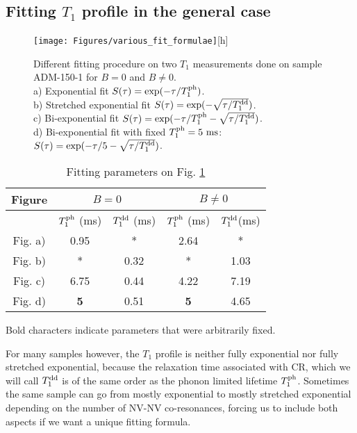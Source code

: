 \documentclass[a4paper,11pt]{report}
\begin{document}
\subsection{Fitting $T_1$ profile in the general case}

\begin{figure}[h]
\centering
\texttt{[image: Figures/various\_fit\_formulae]}[h]
\label{various_fit_formulae}
\caption{Different fitting procedure on two $T_1$ measurements done on sample ADM-150-1 for $B=0$ and $B\neq0$. \\ a) Exponential fit $S(\tau)=\exp (-\tau/T_1^{\rm ph})$. \\ b) Stretched exponential fit $S(\tau)=\exp (-\sqrt{\tau/T_1^{\rm dd}})$. \\ c) Bi-exponential fit $S(\tau)=\exp (-\tau/T_1^{\rm ph} -\sqrt{\tau/T_1^{\rm dd}})$. \\ d) Bi-exponential fit with fixed $T_1^{\rm ph}=5\ \rm ms$: $S(\tau)=\exp (-\tau/5 -\sqrt{\tau/T_1^{\rm dd}})$.}
\end{figure}

\begin{table}[htbp]
\centering
\caption{Fitting parameters on Fig. \ref{various_fit_formulae}}
\begin{tabular}{c|cc|cc}
\toprule
Figure &  \multicolumn{2}{c}{$B=0$} & \multicolumn{2}{c}{$B\neq0$}\\
\midrule
{} &  $T_1^{\rm ph}$ (ms)& $T_1^{\rm dd}$ (ms)&  $T_1^{\rm ph}$ (ms)& $T_1^{\rm dd}$(ms)\\
Fig. a) & 0.95 & * & 2.64 & * \\
Fig. b) & * & 0.32 & * & 1.03  \\
Fig. c) & 6.75 & 0.44 & 4.22 & 7.19 \\
Fig. d) & \textbf{5} & 0.51 & \textbf{5} & 4.65 \\
\bottomrule
\end{tabular}

Bold characters indicate parameters that were arbitrarily fixed.
  \label{fitting table}
\end{table}

For many samples however, the $T_1$ profile is neither fully exponential nor fully stretched exponential, because the relaxation time associated with CR, which we will call $T_1^{\rm dd}$ is of the same order as the phonon limited lifetime $T_1^{\rm ph}$. Sometimes the same sample can go from mostly exponential to mostly stretched exponential depending on the number of NV-NV co-resonances, forcing us to include both aspects if we want a unique fitting formula.
\end{document}
